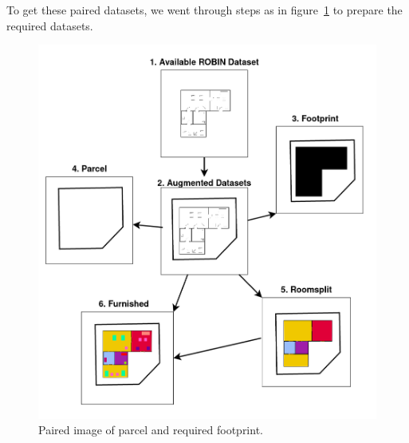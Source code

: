             To get these paired datasets, we went through steps as in figure~\ref{fig:dataset-final-paired} to prepare the required datasets.
            \begin{figure}[h]
                \centering
                    \includegraphics[width=1\linewidth]{img/experiment/dataset/dataset_principal_algorithm.png}
                    \caption{Paired image of parcel and required footprint.}
                    \label{fig:dataset-final-paired}
            \end{figure} 
            
